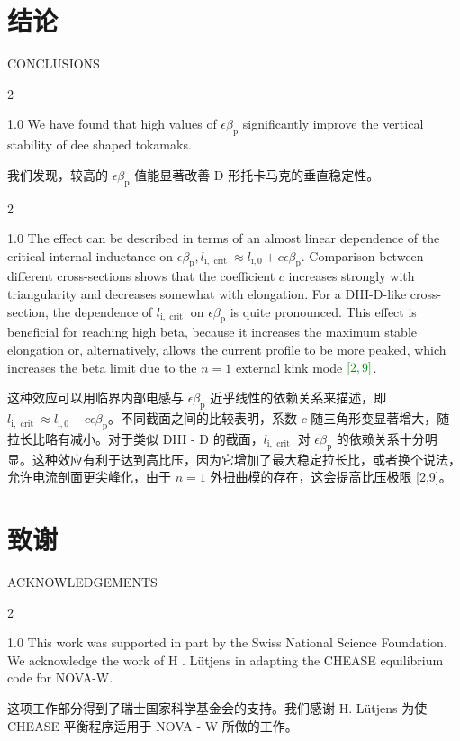 \documentclass[utf8]{ctexart}
\newcommand\enzhbox[2]{
  	\quad\par \begin{paracol}{2} \colseprulecolor{black} 
  		\begin{spacing}{1.0}
  			\footnotesize  #1
  		\end{spacing}
  		\switchcolumn[1] 
  		#2
  	\end{paracol} \quad\par
  }
\begin{document}
\begin{sloppypar}
 \section{结论}
 {  \small CONCLUSIONS \par }
 
\enzhbox{  We have found that high values of $\epsilon \beta_{\mathrm{p}}$ significantly improve the vertical stability of dee shaped tokamaks.}{
我们发现，较高的 $\epsilon \beta_{\mathrm{p}}$ 值能显著改善 D 形托卡马克的垂直稳定性。}
  
 
\enzhbox{  The effect can be described in terms of an almost linear dependence of the critical internal inductance on $\epsilon \beta_{\mathrm{p}}, l_{\mathrm{i}, \text { crit }} \approx l_{\mathrm{i}, 0}+c \epsilon \beta_{\mathrm{p}}$. Comparison between different cross-sections shows that the coefficient $c$ increases strongly with triangularity and decreases somewhat with elongation. For a DIII-D-like cross-section, the dependence of $l_{\mathrm{i}, \text { crit }}$ on $\epsilon \beta_{\mathrm{p}}$ is quite pronounced. This effect is beneficial for reaching high beta, because it increases the maximum stable elongation or, alternatively, allows the current profile to be more peaked, which increases the beta limit due to the $n=1$ external kink mode $\textcolor{green!50!black}{[2,9]}$.}{
这种效应可以用临界内部电感与 $\epsilon \beta_{\mathrm{p}}$ 近乎线性的依赖关系来描述，即 $l_{\mathrm{i}, \text { crit }} \approx l_{\mathrm{i}, 0}+c \epsilon \beta_{\mathrm{p}}$。不同截面之间的比较表明，系数 $c$ 随三角形变显著增大，随拉长比略有减小。对于类似 DIII - D 的截面，$l_{\mathrm{i}, \text { crit }}$ 对 $\epsilon \beta_{\mathrm{p}}$ 的依赖关系十分明显。这种效应有利于达到高比压，因为它增加了最大稳定拉长比，或者换个说法，允许电流剖面更尖峰化，由于 $n = 1$ 外扭曲模的存在，这会提高比压极限 \textcolor{green!50!black}{[2,9]}。 }
  
 \section{致谢}
 {  \small ACKNOWLEDGEMENTS \par }
 
\enzhbox{  This work was supported in part by the Swiss National Science Foundation. We acknowledge the work of H . Lütjens in adapting the CHEASE equilibrium code for NOVA-W.}{
这项工作部分得到了瑞士国家科学基金会的支持。我们感谢 H. Lütjens 为使 CHEASE 平衡程序适用于 NOVA - W 所做的工作。 }
  \setlength{\parskip}{0pt} \small %

\end{sloppypar}
\end{document}
